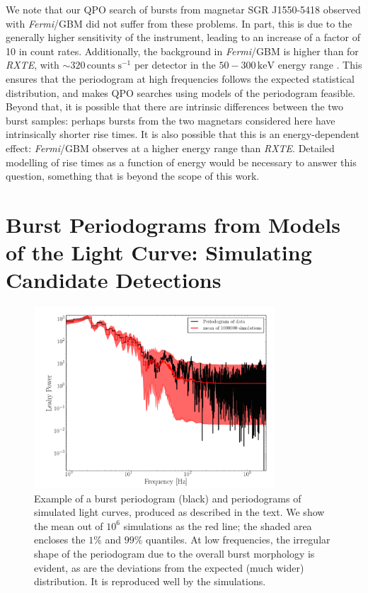 \documentclass[numberedappendix]{emulateapj}
\newcommand{\project}[1]{\textsl{#1}}
\newcommand{\fermi}{\project{Fermi}}
\newcommand{\rxte}{\project{RXTE}}
\begin{document}
We note that our QPO search of bursts from magnetar SGR J1550-5418 observed with \fermi/GBM did not suffer from these problems. In part, this is due to the generally higher sensitivity of the instrument, leading to an increase of a factor of 10 in count rates. Additionally, the background in \fermi/GBM is higher than for \rxte, with $\sim 320 \, \mathrm{counts} \; \mathrm{s}^{-1}$ per detector in the $50 - 300 \, \mathrm{keV}$ energy range \citep{meegan2009}. This ensures that the periodogram at high frequencies follows the expected statistical distribution, and makes QPO searches using models of the periodogram feasible. Beyond that, it is possible that there are intrinsic differences between the two burst samples: perhaps bursts from the two magnetars considered here have intrinsically shorter rise times. It is also possible that this is an energy-dependent effect: \fermi/GBM observes at a higher energy range than \rxte. Detailed modelling of rise times as a function of energy would be necessary to answer this question, something that is beyond the scope of this work.


\section{Burst Periodograms from Models of the Light Curve: Simulating Candidate Detections}
\label{sec:dnest}
\begin{figure}[htbp]
\begin{center}
\includegraphics[width=9cm]{f6.pdf}
\caption{Example of a burst periodogram (black) and periodograms of simulated light curves, produced as described in the text. We show the mean out of $10^6$ simulations as the red line; the shaded area encloses the $1\%$ and $99\%$ quantiles. At low frequencies, the irregular shape
of the periodogram due to the overall burst morphology is evident, as are the deviations from the expected (much wider) distribution.  It is reproduced well by the simulations.}
\label{fig:burst_lcmodel_ps}
\end{center}
\end{figure}
\end{document}
